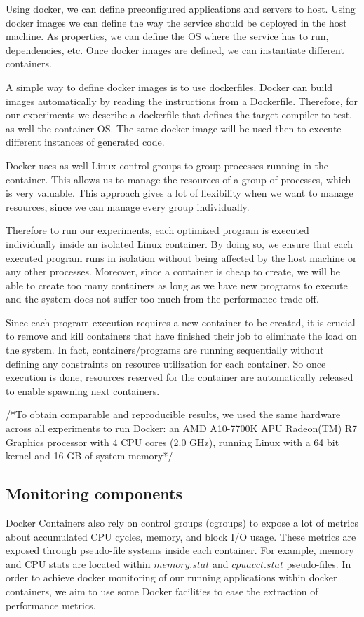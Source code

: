 Using docker, we can define preconfigured applications and servers to host. Using docker images we can define the way the service should be deployed in the host machine. As properties, we can define the OS where the service has to run, dependencies, etc. Once docker images are defined, we can instantiate different containers.

A simple way to define docker images is to use dockerfiles. Docker can build images automatically by reading the instructions from a Dockerfile. Therefore, for our experiments we describe a dockerfile that defines the target compiler to test, as well the container OS. The same docker image will be used then to execute different instances of generated code.

Docker uses as well Linux control groups to group processes running in the container. This allows us to manage the resources of a group of processes, which is very valuable. This approach gives a lot of flexibility when we want to manage resources, since we can manage every group individually. 

Therefore to run our experiments, each optimized program is executed individually inside an isolated Linux container. By doing so, we ensure that each executed program runs in isolation without being affected by the host machine or any other processes. Moreover, since a container is cheap to create, we will be able to create too many containers as long as we have new programs to execute and the system does not suffer too much from the performance trade-off.

Since each program execution requires a new container to be created, it is crucial to remove and kill containers that have finished their job to eliminate the load on the system. In fact, containers/programs are running sequentially without defining any constraints on resource utilization for each container. So once execution is done, resources reserved for the container are automatically released to enable spawning next containers.

/*To obtain comparable and reproducible results, we used the same hardware across all experiments to run Docker: an AMD A10-7700K APU Radeon(TM) R7 Graphics processor with 4 CPU cores (2.0 GHz), running Linux with a 64 bit kernel and 16 GB of system memory*/

\subsection{Monitoring components}
Docker Containers also rely on control groups (cgroups) to expose a lot of metrics about accumulated CPU cycles, memory, and block I/O usage. These metrics are exposed through pseudo-file systems inside each container. For example, memory and CPU stats are located within $memory.stat$ and $cpuacct.stat$ pseudo-files.
In order to achieve docker monitoring of our running applications within docker containers, we aim to use some Docker facilities to ease the extraction of performance metrics.
